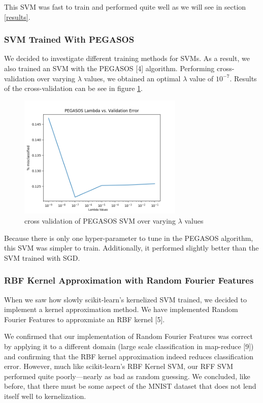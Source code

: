 \documentclass{article} %
\begin{document}
This SVM was fast to train and performed quite well as we will see in section \ref{results}.

\subsubsection{SVM Trained With PEGASOS}
We decided to investigate different training methods for SVMs. As a result, we
also trained an SVM with the PEGASOS [4] algorithm. Performing cross-validation
over varying $\lambda$ values, we obtained an optimal $\lambda$ value of
$10^{-7}$. Results of the cross-validation can be see in figure \ref{fig:pegasos-lambda-cv}.

\begin{figure}[h]
\centering
\includegraphics[width=0.7\textwidth]{pegasos-lambda-cv.png}
\caption{cross validation of PEGASOS SVM over varying $\lambda$ values}
\label{fig:pegasos-lambda-cv}
\end{figure}

Because there is only one hyper-parameter to tune in the PEGASOS algorithm, this
SVM was simpler to train. Additionally, it performed slightly better than the
SVM trained with SGD.

\subsubsection{RBF Kernel Approximation with Random Fourier Features}
When we saw how slowly scikit-learn's kernelized SVM trained, we decided to
implement a kernel approximation method. We have implemented Random Fourier
Features to approxmiate an RBF kernel [5].

We confirmed that our implementation of Random Fourier Features was correct by
applying it to a different domain (large scale classification in map-reduce [9]) and
confirming that the RBF kernel approximation indeed reduces classification
error. However, much like scikit-learn's RBF Kernel SVM, our RFF SVM performed
quite poorly---nearly as bad as random guessing. We concluded, like before, that
there must be some aspect of the MNIST dataset that does not lend itself well to kernelization.
\end{document}
